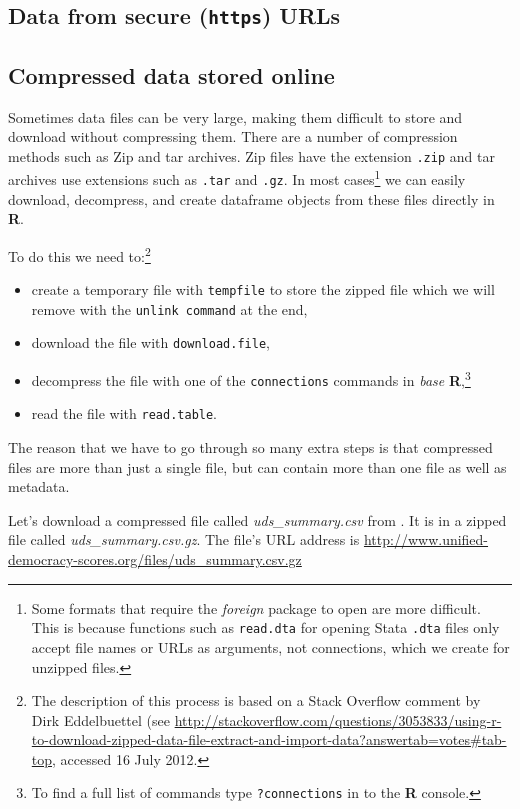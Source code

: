 \documentclass[ChapterTOCs,krantz1]{krantz}\usepackage{graphicx, color}
\begin{document}
\subsection{Data from secure ({\tt{https}}) URLs}

\subsection{Compressed data stored online}

Sometimes data files can be very large, making them difficult to store and download without compressing them. There are a number of compression methods such as Zip and tar archives. Zip files have the extension {\tt{.zip}} and tar archives use extensions such as {\tt{.tar}} and {\tt{.gz}}. In most cases\footnote{Some formats that require the {\emph{foreign}} package to open are more difficult. This is because functions such as {\tt{read.dta}} for opening Stata {\tt{.dta}} files only accept file names or URLs as arguments, not connections, which we create for unzipped files.} we can easily download, decompress, and create dataframe objects from these files directly in {\bf{R}}. 

To do this we need to:\footnote{The description of this process is based on a Stack Overflow comment by Dirk Eddelbuettel (see {\url{http://stackoverflow.com/questions/3053833/using-r-to-download-zipped-data-file-extract-and-import-data?answertab=votes\#tab-top}}, accessed 16 July 2012.}

\begin{itemize}
    \item create a temporary file with {\tt{tempfile}} to store the zipped file which we will remove with the {\tt{unlink command}} at the end,
    \item download the file with {\tt{download.file}},
    \item decompress the file with one of the {\tt{connections}} commands in {\emph{base}} {\bf{R}},\footnote{To find a full list of commands type {\tt{?connections}} in to the {\bf{R}} console.}
    \item read the file with {\tt{read.table}}. 
\end{itemize}

The reason that we have to go through so many extra steps is that compressed files are more than just a single file, but can contain more than one file as well as metadata.

Let's download a compressed file called {\emph{uds\_summary.csv}} from \cite{Pemstein2010}. It is in a zipped file called {\emph{uds\_summary.csv.gz}}. The file's URL address is {\url{http://www.unified-democracy-scores.org/files/uds_summary.csv.gz}}
\end{document}

